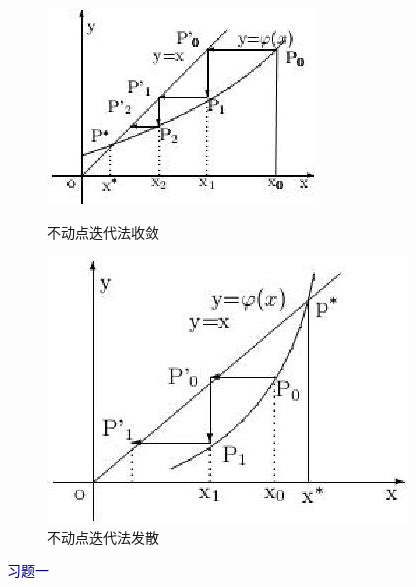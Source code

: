 \begin{figure}[h]
\begin{minipage}[t]{0.5\linewidth}
\centering
\includegraphics[totalheight=1.2in]{fig/tu2-2}
\caption{不动点迭代法收敛} \label{fig:tu2-2}
\end{minipage}
\begin{minipage}[t]{0.5\linewidth}
\centering
\includegraphics[totalheight=1.3in]{fig/tu2-3}
\caption{不动点迭代法发散} \label{fig:tu2-3}
\end{minipage}
\end{figure}



\vspace{0.5cm}
 \centerline{\textcolor{darkblue}{\hei{}
 习题一}}\vspace{0.5cm}


